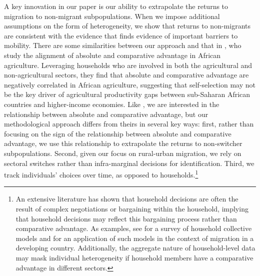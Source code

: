 \documentclass[12pt]{article}
\begin{document}
A key innovation in our paper is our ability to extrapolate the returns to migration to non-migrant subpopulations. 
When we impose additional assumptions on the form of heterogeneity, we show that returns to non-migrants are consistent with the evidence that finds evidence of important barriers to mobility.
There are some similarities between our approach and that in \cite{alvarez-cuadradoSelectionAbsoluteAdvantage2023}, who study the alignment of absolute and comparative advantage in African agriculture.
Leveraging households who are involved in both the agricultural and non-agricultural sectors, they find that absolute and comparative advantage are negatively correlated in African agriculture, suggesting that self-selection may not be the key driver of agricultural productivity gaps between sub-Saharan African countries and higher-income economies.
Like \cite{alvarez-cuadradoSelectionAbsoluteAdvantage2023}, we are interested in the relationship between absolute and comparative advantage, but our methodological approach differs from theirs in several key ways: first, rather than focusing on the sign of the relationship between absolute and comparative advantage, we use this relationship to extrapolate the returns to non-switcher subpopulations.
Second, given our focus on rural-urban migration, we rely on sectoral switches rather than infra-marginal decisions for identification. 
Third, we track individuals' choices over time, as opposed to households.\footnote{An extensive literature has shown that household decisions are often the result of complex negotiations or bargaining within the household, implying that household decisions may reflect this bargaining process rather than comparative advantage. 
As examples, see \cite{vermeulenCollectiveHouseholdModels2002} for a survey of household collective models and \cite{chenIdentifyingNoncooperativeBehavior2013} for an application of such models in the context of migration in a developing country. 
Additionally, the aggregate nature of household-level data may mask individual heterogeneity if household members have a comparative advantage in different sectors.}

\end{document}

